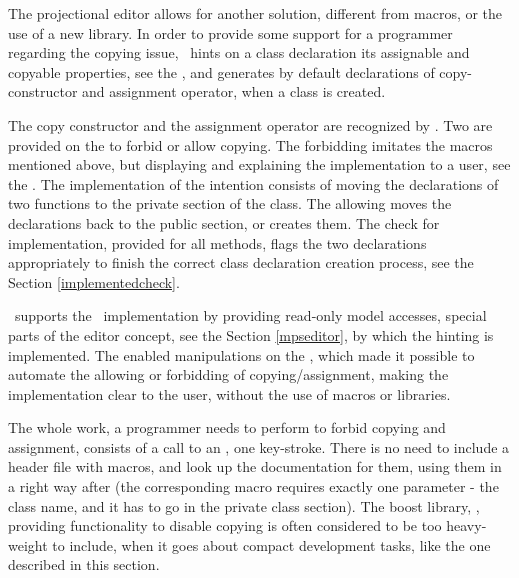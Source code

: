 \pcppsolution



The projectional editor allows for another solution, different from macros, or the use of a new library.  
In order to provide some support for a  programmer regarding the copying issue, \pcpp\ hints on a class declaration its 
assignable and copyable properties, see the , and generates by default declarations of copy-constructor and assignment operator,
when a class is created.

The copy constructor and the assignment operator are recognized by \pcpp. Two  are provided on the 
  to forbid or allow copying. The forbidding  imitates the macros mentioned 
above, but displaying and explaining the implementation to a user, see the . The implementation of the intention 
consists of moving the declarations of two functions to the private section of the class. The allowing  moves
the declarations back to the public section, or creates them. The check for implementation, provided for all methods, flags
the two declarations appropriately to finish the correct class declaration creation process, see the Section \ref{implementedcheck}.


\jbmps\ supports the \pcpp\ implementation by providing read-only model accesses, special parts of the editor concept,
 see the Section \ref{mpseditor}, by which the hinting is implemented. The  enabled manipulations on the  , 
which made it possible to  automate the allowing or forbidding of copying/assignment, making the implementation clear 
to the user, without the use of macros or libraries. 

The whole work, a programmer needs to perform to forbid copying and assignment, consists of a call to an , 
one key-stroke. There is no need to include a header file with macros, and look up the documentation for them, using 
them in a right way after (the corresponding macro requires exactly one parameter - the class name, and it has to go in 
the private class section). The boost library, \cite{boost}, providing functionality to disable copying is often considered to be too
heavy-weight to include, when it goes about compact development tasks, like the one described in this section.








